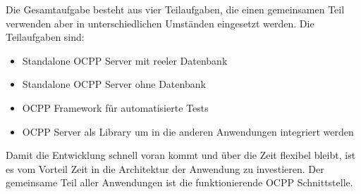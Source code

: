 Die Gesamtaufgabe besteht aus vier Teilaufgaben, die einen gemeinsamen Teil verwenden aber in unterschiedlichen Umständen eingesetzt werden.
Die Teilaufgaben sind:

\begin{itemize}
    \item Standalone OCPP Server mit reeler Datenbank
    \item Standalone OCPP Server ohne Datenbank
    \item OCPP Framework für automatisierte Tests
    \item OCPP Server als Library um in die anderen Anwendungen integriert werden
\end{itemize}

Damit die Entwicklung schnell voran kommt und über die Zeit flexibel bleibt, ist es vom Vorteil Zeit in die Architektur der Anwendung 
zu investieren. Der gemeinsame Teil aller Anwendungen ist die funktionierende OCPP Schnittstelle. 